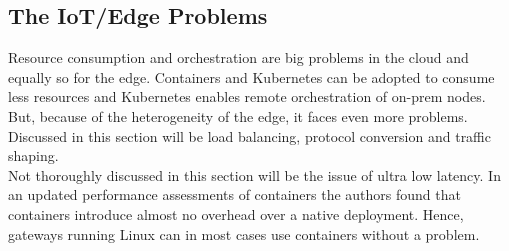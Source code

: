 \subsection{The IoT/Edge Problems} \label{edgeIoT}
Resource consumption and orchestration are big problems in the cloud and equally so for the edge. Containers and Kubernetes can be adopted to consume less resources and Kubernetes enables remote orchestration of on-prem nodes. But, because of the heterogeneity of the edge, it faces even more problems. Discussed in this section will be load balancing, protocol conversion and traffic shaping.\\ Not thoroughly discussed in this section will be the issue of ultra low latency. In an updated performance assessments of containers the authors found that containers introduce almost no overhead over a native deployment\cite{felter2015updatedPerformanceContainers}. Hence, gateways running Linux can in most cases use containers without a problem. 







